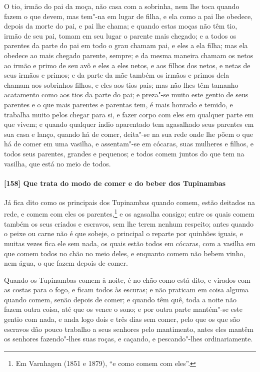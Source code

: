 \begin{linenumbers}
O tio, irmão do pai da moça, não casa com a sobrinha, nem lhe toca quando fazem o que
devem, mas tem"-na em lugar de filha, e ela como a pai lhe obedece, depois da morte do pai,
e pai lhe chama; e quando estas moças não têm tio, irmão de seu pai, tomam em seu lugar o
parente mais chegado; e a todos os parentes da parte do pai em todo o grau chamam pai, e
eles a ela filha; mas ela obedece ao mais chegado parente, sempre; e da mesma maneira
chamam os netos ao irmão e primo de seu avô e eles a eles netos, e aos filhos dos netos, e
netas de seus irmãos e primos; e da parte da mãe também os irmãos e primos dela chamam aos
sobrinhos filhos, e eles aos tios pais; mas não lhes têm tamanho acatamento como aos tios
da parte do pai; e preza"-se muito este gentio de seus parentes e o que mais parentes e
parentas tem, é mais honrado e temido, e trabalha muito pelos chegar para si, e fazer
corpo com eles em qualquer parte em que vivem; e quando qualquer índio aparentado tem
agasalhado seus parentes em sua casa e lanço, quando há de comer, deita"-se na sua rede
onde lhe põem o que há de comer em uma vasilha, e assentam"-se em cócaras, suas mulheres e
filhos, e todos seus parentes, grandes e pequenos; e todos comem juntos do que tem na
vasilha, que está no meio de todos.

\paragraph{[158] Que trata do modo de comer e do beber dos Tupinambas}\quad
Já fica dito como os principais dos Tupinambas quando comem, estão deitados na rede, e
comem com eles os parentes,\footnote{ Em Varnhagen (1851 e 1879), ``e como comem com
eles''.} e os agasalha consigo; entre os quais comem também os seus criados e escravos,
sem lhe terem nenhum respeito; antes quando o peixe ou carne não é que sobeje, o principal
o reparte por quinhões iguais, e muitas vezes fica ele sem nada, os quais estão todos em
cócaras, com a vasilha em que comem todos no chão no meio deles, e enquanto comem não
bebem vinho, nem água, o que fazem depois de comer.

Quando os Tupinambas comem à noite, é no chão como está dito, e virados com as costas para
o fogo, e ficam todos às escuras; e não praticam em coisa alguma quando comem, senão
depois de comer; e quando têm quê, toda a noite não fazem outra coisa, até que os vence o
sono; e por outra parte mantém"-se este gentio com nada, e anda logo dois e três dias sem
comer, pelo que os que são escravos dão pouco trabalho a seus senhores pelo mantimento,
antes eles mantêm os senhores fazendo"-lhes suas roças, e caçando, e pescando"-lhes
ordinariamente.


\end{linenumbers}
